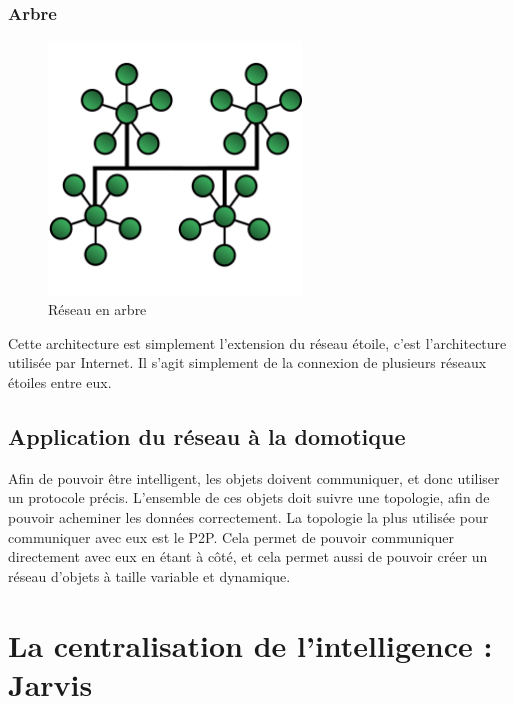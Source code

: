 	    \subsubsection{Arbre}
\begin{figure}[!ht]
         \centering
         \includegraphics[width=0.6\textwidth]{img/TreeTopology.png}
         \caption{Réseau en arbre}
         \label{TreeNetwork}
\end{figure}
Cette architecture est simplement l'extension du réseau étoile, c'est l'architecture utilisée par Internet. Il 
s'agit simplement de la connexion de plusieurs réseaux étoiles entre eux.
	\subsection{Application du réseau à la domotique}
Afin de pouvoir être intelligent, les objets doivent communiquer, et donc utiliser un protocole précis. 
L'ensemble de ces objets doit suivre une topologie, afin de pouvoir acheminer les données correctement. La topologie la plus utilisée pour communiquer avec eux est le P2P. Cela permet de pouvoir communiquer directement avec eux en étant à côté, et cela permet aussi de pouvoir créer un réseau d'objets à taille variable et dynamique.


\section{La centralisation de l’intelligence : Jarvis}
